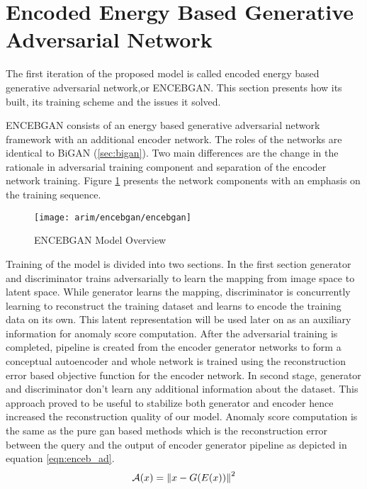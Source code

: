 \section{Encoded Energy Based Generative Adversarial Network}
\label{sec:encebgan}

The first iteration of the proposed model is called encoded energy based generative adversarial
network,or ENCEBGAN. This section presents how its built, its training scheme and the issues it
solved.

ENCEBGAN consists of an energy based generative adversarial network framework with an additional
encoder network. The roles of the networks are identical to BiGAN (\ref{sec:bigan}). Two main
differences are the change in the rationale in adversarial training component and separation of the
encoder network training. Figure \ref{fig:encebgan_model} presents the network components with an
emphasis on the training sequence.
\begin{figure}[h!]
	\centering
	\texttt{[image: arim/encebgan/encebgan]}
	\caption{ENCEBGAN Model Overview }
	\label{fig:encebgan_model}
\end{figure}

Training of the model is divided into two sections. In the first section generator and discriminator
trains adversarially to learn the mapping from image space to latent space. While generator learns
the mapping, discriminator is concurrently learning to reconstruct the training dataset and learns
to encode the training data on its own. This latent representation will be used later on as an
auxiliary information for anomaly score computation. After the adversarial training is completed,
pipeline is created from the encoder generator networks to form a conceptual autoencoder and whole
network is trained using the reconstruction error based objective function for the encoder network.
In second stage, generator and discriminator don't learn any additional information about the
dataset. This approach proved to be useful to stabilize both generator and encoder hence increased
the reconstruction quality of our model. Anomaly score computation is the same as the pure gan based
methods which is the reconstruction error between the query and the output of encoder generator
pipeline as depicted in equation \ref{eqn:enceb_ad}. 
\begin{equation}
	\label{eqn:enceb_ad}
	\mathcal{A}(x) = \left\lVert x - G(E(x))\right\rVert^2
\end{equation}

